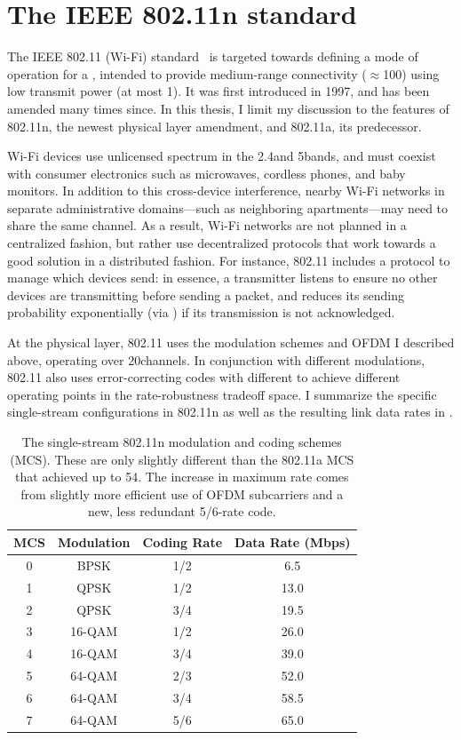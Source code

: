 \section{The IEEE 802.11n standard}
The IEEE 802.11 (Wi-Fi) standard~\cite{80211} is targeted towards defining a mode of operation for a , intended to provide medium-range connectivity ($\approx$100\m) using low transmit power (at most 1\W). It was first introduced in 1997, and has been amended many times since. In this thesis, I limit my discussion to the features of 802.11n, the newest physical layer amendment, and 802.11a, its predecessor.

Wi-Fi devices use unlicensed spectrum in the 2.4\GHz and 5\GHz bands, and must coexist with consumer electronics such as microwaves, cordless phones, and baby monitors. In addition to this cross-device interference, nearby Wi-Fi networks in separate administrative domains---such as neighboring apartments---may need to share the same channel. As a result, Wi-Fi networks are not planned in a centralized fashion, but rather use decentralized protocols that work towards a good solution in a distributed fashion. For instance, 802.11 includes a  protocol to manage which devices send: in essence, a transmitter listens to ensure no other devices are transmitting before sending a packet, and reduces its sending probability exponentially (via ) if its transmission is not acknowledged.

At the physical layer, 802.11 uses the modulation schemes and OFDM I described above, operating over 20\MHz channels. In conjunction with different modulations, 802.11 also uses error-correcting codes with different  to achieve different operating points in the rate-robustness tradeoff space. I summarize the specific single-stream configurations in 802.11n as well as the resulting link data rates in .

\begin{table}[t]
\centering
\begin{tabular}{cccc}
\toprule
MCS & Modulation & Coding Rate & Data Rate (Mbps) \\
\midrule
0 & BPSK & 1/2 & 6.5 \\
1 & QPSK & 1/2 & 13.0\\
2 & QPSK & 3/4 & 19.5\\
3 & 16-QAM & 1/2 & 26.0\\
4 & 16-QAM & 3/4 & 39.0\\
5 & 64-QAM & 2/3 & 52.0\\
6 & 64-QAM & 3/4 & 58.5\\
7 & 64-QAM & 5/6 & 65.0\\
\bottomrule
\end{tabular}
\caption[The 802.11n single-stream rates]{\label{tab:siso_mcs} The single-stream 802.11n modulation and coding schemes (MCS). These are only slightly different than the 802.11a MCS that achieved up to 54\Mbps. The increase in maximum rate comes from slightly more efficient use of OFDM subcarriers and a new, less redundant 5/6-rate code.}
\end{table}

